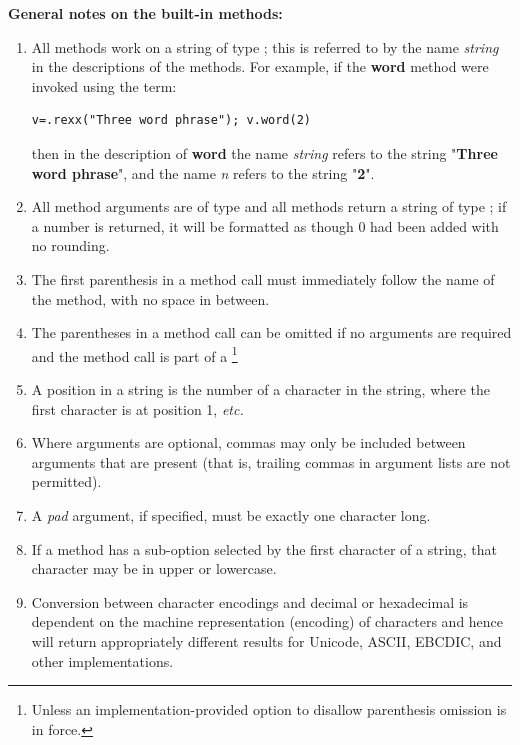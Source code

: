 \textbf{General notes on the built-in methods:}
\begin{enumerate}
\item All methods work on a \crexx{} string of type ; this
is referred to by the name \emph{string} in the descriptions of the
methods.  For example, if the \textbf{word} method were invoked using
the term:
\begin{lstlisting}
v=.rexx("Three word phrase"); v.word(2)
\end{lstlisting}
then in the description of \textbf{word} the name
\emph{string} refers to the string "\textbf{Three word
phrase}", and the name \emph{n} refers to the string
"\textbf{2}".
\item All method arguments are of type  and all methods
return a string of type ; if a number is returned, it
will be formatted as though 0 had been added with no rounding.
\item 
The first parenthesis in a method call must immediately follow the name
of the method, with no space in between.
\item The parentheses in a method call can be omitted if no
arguments are required and the method call is part of a
\footnote{
Unless an implementation-provided option to disallow parenthesis
omission is in force.
}
\item A position in a string is the number of a character in the string,
where the first character is at position 1, \emph{etc.}
\item Where arguments are optional, commas may only be included between
arguments that are present (that is, trailing commas in argument lists
are not permitted).
\item A \emph{pad} argument, if specified, must be exactly one
character long.
\item If a method has a sub-option selected by the first character of a
string, that character may be in upper or lowercase.
\item Conversion between character encodings and decimal or hexadecimal
is dependent on the machine representation (encoding) of characters
and hence will return appropriately different results for Unicode,
ASCII, EBCDIC, and other implementations.
\end{enumerate}
\label{builtinfunctions}
